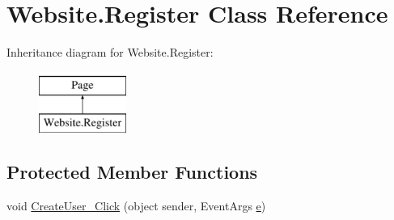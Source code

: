 \hypertarget{class_website_1_1_register}{}\section{Website.\+Register Class Reference}
\label{class_website_1_1_register}
Inheritance diagram for Website.\+Register\+:\begin{figure}[H]
\begin{center}
\leavevmode
\includegraphics[height=2.000000cm]{class_website_1_1_register}
\end{center}
\end{figure}
\subsection*{Protected Member Functions}
\begin{DoxyCompactItemize}
\item 
void \hyperlink{class_website_1_1_register_afbed152cfda510f874b9ca5cbba38668}{Create\+User\+\_\+\+Click} (object sender, Event\+Args \hyperlink{jquery_8unobtrusive-ajax_8min_8js_a1bbdb559c9d41205c42f84b233650eb3}{e})
\end{DoxyCompactItemize}
